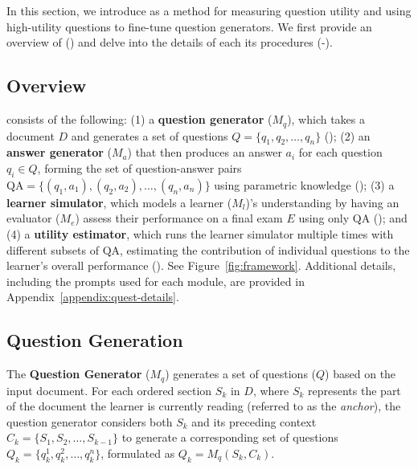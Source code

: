 \section{\ours}
\label{sec:framework}

In this section, we introduce \ours as a method for measuring question utility and using high-utility questions to fine-tune question generators. 
We first provide an overview of \ours () and delve into the details of each its procedures (-). 



\subsection{Overview}
\label{ssec:quest-overview}

\ours consists of the following:
(1) a \textbf{question generator} (\(M_q\)), which takes a document \(D\) and generates a set of questions \(Q = \{q_1, q_2, \dots, q_n\}\) ();
(2) an \textbf{answer generator} (\(M_a\)) that then produces an answer \(a_i\) for each question \(q_i \in Q\), forming the set of question-answer pairs \(\text{QA} = \{(q_1, a_1), (q_2, a_2), \dots, (q_n, a_n)\}\) using parametric knowledge ();
(3) a \textbf{learner simulator}, which models a learner (\(M_l\))’s understanding by having an evaluator (\(M_e\)) assess their performance on a final exam $E$ using only \(\text{QA}\) (); and
(4) a \textbf{utility estimator}, which runs the learner simulator multiple times with different subsets of \(\text{QA}\), estimating the contribution of individual questions to the learner’s overall performance ().
See Figure~\ref{fig:framework}.
Additional details, including the prompts used for each module, are provided in Appendix~\ref{appendix:quest-details}.


\subsection{Question Generation}
\label{ssec:quest-question-generation}
The \textbf{Question Generator} (\( M_q \)) generates a set of questions (\( Q \)) based on the input document.
For each ordered section \( S_k \) in \( D \), where \( S_k \) represents the part of the document the learner is currently reading (referred to as the \textit{anchor}), the question generator considers both \( S_k \) and its preceding context \( C_k = \{S_1, S_2, \dots, S_{k-1}\}\) to generate a corresponding set of questions \( Q_k = \{q_k^1, q_k^2, \dots, q_k^n\} \), formulated as \( Q_k = M_q(S_k, C_k) \).


